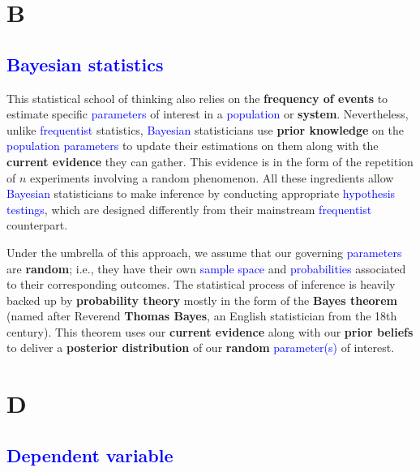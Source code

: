 \documentclass[
  letterpaper,
  DIV=11,
  numbers=noendperiod]{scrreprt}
\begin{document}
\section*{B}\label{b}


\subsection*{\texorpdfstring{\textcolor{blue}{Bayesian statistics}}{}}\label{section}

This statistical school of thinking also relies on the \textbf{frequency
of events} to estimate specific \textcolor{blue}{parameters} of interest
in a \textcolor{blue}{population} or \textbf{system}. Nevertheless,
unlike \textcolor{blue}{frequentist} statistics,
\textcolor{blue}{Bayesian} statisticians use \textbf{prior knowledge} on
the \textcolor{blue}{population parameters} to update their estimations
on them along with the \textbf{current evidence} they can gather. This
evidence is in the form of the repetition of \(n\) experiments involving
a random phenomenon. All these ingredients allow
\textcolor{blue}{Bayesian} statisticians to make inference by conducting
appropriate \textcolor{blue}{hypothesis testings}, which are designed
differently from their mainstream \textcolor{blue}{frequentist}
counterpart.

Under the umbrella of this approach, we assume that our governing
\textcolor{blue}{parameters} are \textbf{random}; i.e., they have their
own \textcolor{blue}{sample space} and \textcolor{blue}{probabilities}
associated to their corresponding outcomes. The statistical process of
inference is heavily backed up by \textbf{probability theory} mostly in
the form of the \textbf{Bayes theorem} (named after Reverend
\textbf{Thomas Bayes}, an English statistician from the 18th century).
This theorem uses our \textbf{current evidence} along with our
\textbf{prior beliefs} to deliver a \textbf{posterior distribution} of
our \textbf{random} \textcolor{blue}{parameter(s)} of interest.

\section*{D}\label{d}


\subsection*{\texorpdfstring{\textcolor{blue}{Dependent variable}}{}}\label{section-1}
\end{document}
